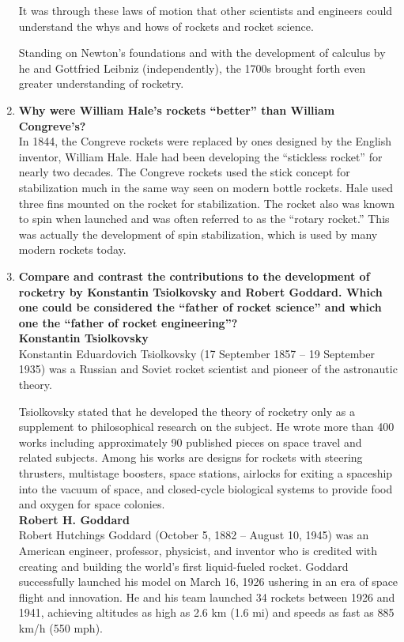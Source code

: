 \documentclass{article}
\begin{document}
\begin{enumerate}
It was through these laws of motion that other scientists and engineers could understand the whys and hows of rockets and rocket science.

Standing on Newton’s foundations and with the development of calculus by he and Gottfried Leibniz (independently), the 1700s brought forth even greater understanding of rocketry. \cite{book}
	
	\item {\bf Why were William Hale’s rockets “better” than William Congreve’s?}\\

In 1844, the Congreve rockets were replaced by ones designed by the English inventor, William Hale. Hale had been developing the “stickless rocket” for nearly two decades. The Congreve rockets used the stick concept for stabilization much in the same way seen on modern bottle rockets. Hale used three fins mounted on the rocket for stabilization. The rocket also was known to spin when launched and was often referred to as the “rotary rocket.” This was actually the development of spin stabilization, which is used by many modern rockets today. \cite{book}

	\item {\bf Compare and contrast the contributions to the development of rocketry by Konstantin Tsiolkovsky and Robert Goddard. Which one could be considered the “father of rocket science” and which one the “father of rocket engineering”?}\\
	
{\bf Konstantin Tsiolkovsky}\\
Konstantin Eduardovich Tsiolkovsky (17 September 1857  – 19 September 1935) was a Russian and Soviet rocket scientist and pioneer of the astronautic theory.

Tsiolkovsky stated that he developed the theory of rocketry only as a supplement to philosophical research on the subject. He wrote more than 400 works including approximately 90 published pieces on space travel and related subjects. Among his works are designs for rockets with steering thrusters, multistage boosters, space stations, airlocks for exiting a spaceship into the vacuum of space, and closed-cycle biological systems to provide food and oxygen for space colonies. \cite{konstantin}
\\

{\bf Robert H. Goddard}\\
Robert Hutchings Goddard (October 5, 1882 – August 10, 1945) was an American engineer, professor, physicist, and inventor who is credited with creating and building the world's first liquid-fueled rocket. Goddard successfully launched his model on March 16, 1926 ushering in an era of space flight and innovation. He and his team launched 34 rockets between 1926 and 1941, achieving altitudes as high as 2.6 km (1.6 mi) and speeds as fast as 885 km/h (550 mph).


\end{enumerate}
\end{document}
